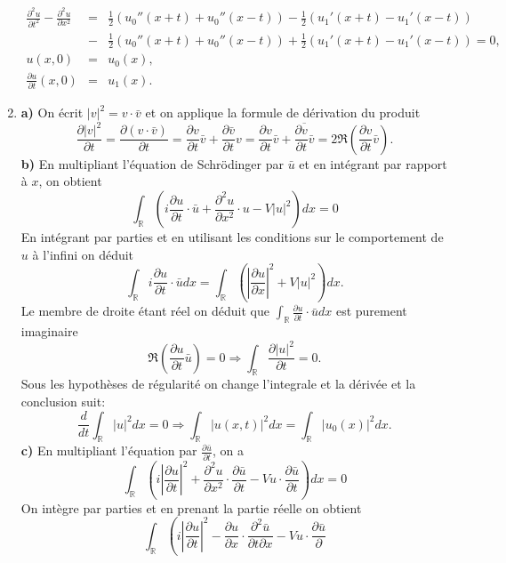 \documentclass[12pt,a4paper]{article}
\begin{document}
\begin{enumerate}
$$
\begin{array}{lcl}
\displaystyle\frac{\partial^2u}{\partial t^2}-\frac{\partial^2u}{\partial x^2} &=&
\frac{1}{2}(u_0''(x+t) + u_0''(x-t))-\frac{1}{2}(u_1'(x+t) -
u_1'(x-t))\\
&-&\frac{1}{2}(u_0''(x+t) + u_0''(x-t))+\frac{1}{2}(u_1'(x+t) -
u_1'(x-t))=0,\\
u(x,0) &= &u_0(x),\\
\frac{\partial u}{\partial t}(x,0)&=&u_1(x).
\end{array}
$$
\item
{\bf a)} On \'ecrit $|v|^2=v\cdot \bar v$ et on applique la formule de
d\'erivation du produit
$$
\frac{\partial |v|^2}{\partial t} = \frac{\partial (v\cdot \bar v)}{\partial t} =\frac{\partial v}{\partial t}\bar
v + \frac{\partial \bar v}{\partial t}v = \frac{\partial v}{\partial t}\bar
v + \overline{\frac{\partial v}{\partial t}\bar v} = 2 \Re\left(\frac{\partial v}{\partial t}\bar v\right).
$$
{\bf b)} En multipliant l'\'equation de Schr\"odinger par $\bar u$ et en int\'egrant par
rapport \`a $x$, on obtient
$$
\int_{\mathbb{R}}\left(i\frac{\partial u}{\partial t}\cdot \bar u +\frac{\partial^2 u}{\partial x^2}\cdot u-V|u|^2\right)dx=0
$$
En int\'egrant par parties et en utilisant les conditions sur le
comportement de $u$ \`a l'infini on d\'eduit
$$
\int_{\mathbb{R}}i\frac{\partial u}{\partial t}\cdot \bar u dx= \int_{\mathbb{R}}\left(\left|\frac{\partial u}{\partial x}\right|^2+V|u|^2\right)dx.
$$
Le membre de droite \'etant r\'eel on d\'eduit que
$\int_{\mathbb{R}}\frac{\partial u}{\partial t}\cdot \bar u dx$ est
purement imaginaire
$$
\Re\left(\frac{\partial u}{\partial t}\bar u\right)=0 \Rightarrow
\int_{\mathbb{R}} \frac{\partial |u|^2}{\partial t} =0.
$$
Sous les hypoth\`eses de r\'egularit\'e on change l'integrale et la
d\'eriv\'ee et la conclusion suit:
\begin{equation}
\frac{d}{dt}\int_{\mathbb{R}}|u|^2dx=0\Rightarrow \int_{\mathbb{R}}|u(x,t)|^2dx = \int_{\mathbb{R}}|u_0(x)|^2dx.
\end{equation}
{\bf c)} En multipliant l'\'equation par $\frac{\partial \bar
  u}{\partial t}$, on a 
$$
\int_{\mathbb{R}}\left(i\left|\frac{\partial u}{\partial t}\right|^2
  +\frac{\partial^2 u}{\partial x^2}\cdot \frac{\partial \bar
    u}{\partial t}-Vu\cdot\frac{\partial \bar u}{\partial t}\right)dx=0
$$
On int\`egre par parties et en prenant la partie r\'eelle on obtient
$$
\int_{\mathbb{R}}\left(i\left|\frac{\partial u}{\partial t}\right|^2
  -\frac{\partial u}{\partial x}\cdot \frac{\partial^2 \bar
    u}{\partial t\partial x}-Vu\cdot\frac{\partial \bar u}{\partial
}$$
\end{enumerate}
\end{document}

